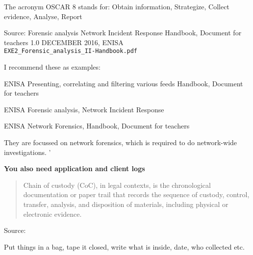 \documentclass[Screen16to9,17pt]{foils}
\begin{document}
The acronym OSCAR 8 stands for: Obtain information,
Strategize,
Collect evidence,
Analyse,
Report

Source: Forensic analysis Network Incident Response Handbook, Document for teachers 1.0 DECEMBER 2016, ENISA\\
\verb+EXE2_Forensic_analysis_II-Handbook.pdf+



\begin{list2}
\item I recommend these as examples:
\item ENISA Presenting, correlating and filtering various feeds Handbook, Document for teachers\\ 
\item ENISA Forensic analysis, Network Incident Response\\ 
\item ENISA Network Forensics, Handbook, Document for teachers\\ 
\end{list2}

They are focussed on network forensics, which is required to do network-wide investigations. '

{\bf You also need application and client logs}




\begin{quote}
Chain of custody (CoC), in legal contexts, is the chronological documentation or paper trail that records the sequence of custody, control, transfer, analysis, and disposition of materials, including physical or electronic evidence.
\end{quote}
Source: 

\begin{list2}
\item Put things in a bag, tape it closed, write what is inside, date, who collected etc.
\end{list2}
\end{document}
